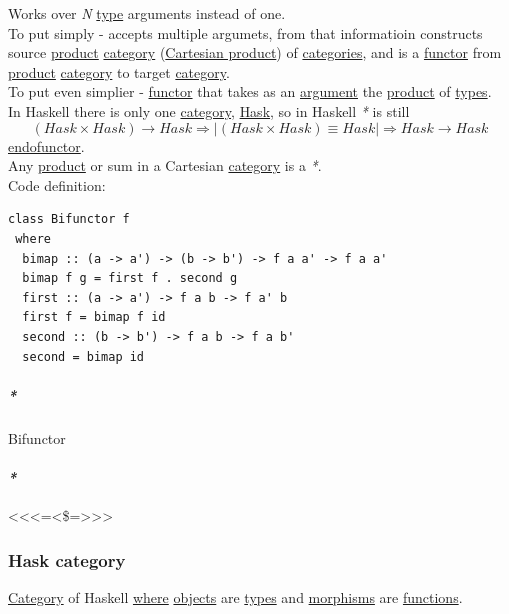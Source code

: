 \documentclass[11pt]{article}
\begin{document}
Works over \emph{N} \hyperref[orgc4aea2f]{type} arguments instead of one.\\

To put simply - accepts multiple argumets, from that informatioin constructs source \hyperref[org80a0b6e]{product} \hyperref[org0450535]{category} (\hyperref[orgbaf1ac4]{Cartesian product}) of \hyperref[org2f49b91]{categories}, and is a \hyperref[orgf2f6841]{functor} from \hyperref[org80a0b6e]{product} \hyperref[org0450535]{category} to target \hyperref[org0450535]{category}.\\

To put even simplier - \hyperref[orgf2f6841]{functor} that takes as an \hyperref[orga6b7e97]{argument} the \hyperref[org80a0b6e]{product} of \hyperref[org4209edd]{types}.\\

In Haskell there is only one \hyperref[org0450535]{category}, \hyperref[org02813f7]{Hask}, so in Haskell \emph{*} is still $$ (Hask \times Hask) \rightarrow Hask \Rightarrow | (Hask \times Hask) \equiv Hask | \Rightarrow Hask \rightarrow Hask $$ \hyperref[orga4a1776]{endofunctor}.\\

Any \hyperref[org80a0b6e]{product} or sum in a Cartesian \hyperref[org0450535]{category} is a \emph{*}.\\

Code definition:\\
\begin{verbatim}
class Bifunctor f
 where
  bimap :: (a -> a') -> (b -> b') -> f a a' -> f a a'
  bimap f g = first f . second g
  first :: (a -> a') -> f a b -> f a' b
  first f = bimap f id
  second :: (b -> b') -> f a b -> f a b'
  second = bimap id
\end{verbatim}

\subparagraph{\emph{*}}
\label{sec:org7c2b0fc}
\label{orgfd5d693}Bifunctor\\

\paragraph{\emph{*}}
\label{sec:org2dbe713}

<<<=<\$=>>>\\

\subsubsection{\label{org3fe1990}Hask category}
\label{sec:org16b7c54}
\hyperref[org0450535]{Category} of Haskell \hyperref[org3e5903d]{where} \hyperref[org363acc2]{objects} are \hyperref[org4209edd]{types} and \hyperref[org6c2fa5c]{morphisms} are \hyperref[orgaa8fb87]{functions}.\\
\end{document}
